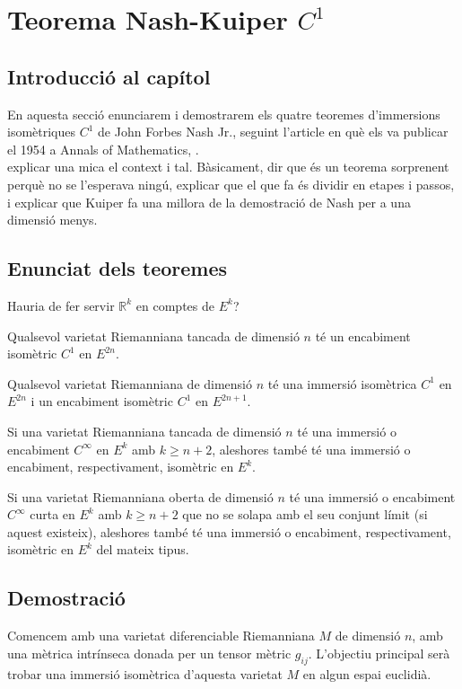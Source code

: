 \chapter{Teorema Nash-Kuiper $C^1$}
\section{Introducció al capítol}
En aquesta secció enunciarem i demostrarem els quatre teoremes d'immersions isomètriques $C^1$ de John Forbes Nash Jr., seguint l'article en què els va publicar el 1954 a Annals of Mathematics, \cite{nash1954}.\\
{\color{blue} explicar una mica el context i tal. Bàsicament, dir que és un teorema sorprenent perquè no se l'esperava ningú, explicar que el que fa és dividir en etapes i passos, i explicar que Kuiper fa una millora de la demostració de Nash per a una dimensió menys.}
\section{Enunciat dels teoremes}
{\color{blue} Hauria de fer servir $\mathbb R^k$ en comptes de $E^k$?}
\begin{teo}
    Qualsevol varietat Riemanniana tancada de dimensió $n$ té un encabiment isomètric $C^1$ en $E^{2n}$.
\end{teo}
\begin{teo}
    Qualsevol varietat Riemanniana de dimensió $n$ té una immersió isomètrica $C^1$ en $E^{2n}$ i un encabiment isomètric $C^1$ en $E^{2n+1}$.
\end{teo}
\begin{teo}
    Si una varietat Riemanniana tancada de dimensió $n$ té una immersió o encabiment $C^\infty$ en $E^{k}$ amb $k\ge n+2$, aleshores també té una immersió o encabiment, respectivament, isomètric en $E^{k}$.
\end{teo}
\begin{teo}
    Si una varietat Riemanniana oberta de dimensió $n$ té una immersió o encabiment $C^\infty$ curta en $E^{k}$ amb $k\ge n+2$ que no se solapa amb el seu conjunt límit (si aquest existeix), aleshores també té una immersió o encabiment, respectivament, isomètric en $E^{k}$ del mateix tipus.
\end{teo}
\section{Demostració}
Comencem amb una varietat diferenciable Riemanniana $M$ de dimensió $n$, amb una mètrica intrínseca donada per un tensor mètric $g_{ij}$. L'objectiu principal serà trobar una immersió isomètrica d'aquesta varietat $M$ en algun espai euclidià.

